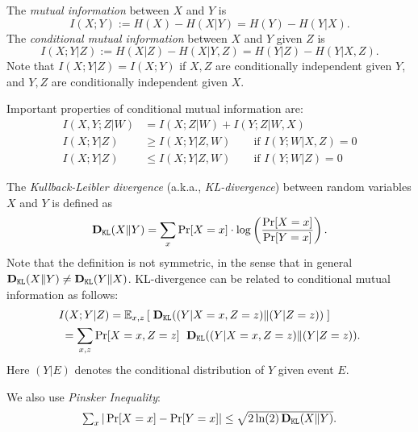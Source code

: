 The \emph{mutual information} between $X$ and $Y$ is
\[ I(X;Y) := H(X) - H(X|Y) = H(Y) - H(Y|X).\]
The \emph{conditional mutual information} between $X$ and $Y$ given $Z$ is
\[ I(X;Y|Z) := H(X|Z) - H(X|Y,Z) = H(Y|Z) - H(Y|X,Z).\]
Note that $I(X;Y|Z) = I(X;Y)$ if $X,Z$ are conditionally independent given $Y$, and $Y,Z$ are conditionally independent given $X$.

Important properties of conditional mutual information are:
\begin{align}
I(X,Y;Z|W) &= I(X;Z|W) + I(Y;Z|W,X) \\
I(X;Y|Z) &\geq I(X;Y|Z,W) \qquad\text{if $I(Y;W|X,Z) = 0$} \\
I(X;Y|Z) &\leq I(X;Y|Z,W) \qquad\text{if $I(Y;W|Z) = 0$}
\end{align}

The \emph{Kullback-Leibler divergence} (a.k.a., \emph{KL-divergence}) between random variables $X$ and $Y$ is defined as
\[ \textbf{D}_{\mathtt{KL}}(X\| Y) = \sum_x \Pr[X = x]
    \cdot \log\left( \frac{\Pr[X = x]}{\Pr[Y = x]} \right) .\]
Note that the definition is not symmetric, in the sense that in general
    $\textbf{D}_{\mathtt{KL}}(X\| Y)\neq \textbf{D}_{\mathtt{KL}}(Y\| X)$.
KL-divergence can be related to conditional mutual information as follows:
\begin{align}
&I(X;Y|Z)
    = \mathbb{E}_{x,z}\left[ \; \textbf{D}_{\mathtt{KL}}((Y|X = x, Z=z)\|(Y|Z=z)) \; \right] \nonumber \\
&\;= \sum_{x,z} \Pr[X=x,Z=z]\;\ \textbf{D}_{\mathtt{KL}}((Y|X = x, Z=z)\|(Y|Z=z)).
\end{align}
Here $(Y|E)$ denotes the conditional distribution of $Y$ given event $E$.

We also use \emph{Pinsker Inequality}:
\begin{align}
\textstyle \sum_x | \Pr[X=x] - \Pr[Y=x]| \leq \sqrt{2 \ln(2)\, \textbf{D}_{\mathtt{KL}}(X\|Y)}.
\end{align}

